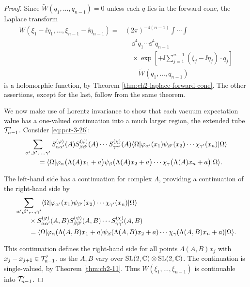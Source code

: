 \begin{proof}
Since $\widetilde{W}(q_1,\ldots,q_{n-1})=0$ unless each $q$ lies in the
forward cone, the Laplace transform
\begin{equation*}
 \begin{aligned}
 W(\xi_1-\ii\eta_1,\ldots,\xi_{n-1}-\ii\eta_{n-1})
 ={}&(2\pi)^{-4(n-1)}\int\cdots\int\\[-2pt]
 &\quad\dd^4q_1\cdots\dd^4q_{n-1}\\[-2pt]
 &\quad\times\exp\!\left[+\ii\sum_{j=1}^{n-1}
 (\xi_j-\ii\eta_j)\!\cdot q_j\right]\\[-2pt]
 &\qquad\widetilde{W}(q_1,\ldots,q_{n-1})
 \end{aligned}
\end{equation*}
is a holomorphic function, by Theorem \ref{thm:ch2-laplace-forward-cone}. The other assertions, except for
the last, follow from the same theorem.

We now make use of Lorentz invariance to show that each vacuum expectation
value has a one-valued continuation into a much larger region, the extended
tube $\mathcal{T}^{\prime}_{n-1}$. Consider \eqref{eq:pct-3-26}:
\begin{align*}
 &\sum_{\alpha',\beta',\ldots,\gamma'}
 S^{(\varphi)}_{\alpha\alpha'}(A)S^{(\psi)}_{\beta\beta'}(A)\cdots
 S^{(\chi)}_{\gamma\gamma'}(A)
 \langle \Omega\rvert\varphi_{\alpha'}(x_1)\psi_{\beta'}(x_2)\cdots
 \chi_{\gamma'}(x_n)\lvert \Omega\rangle \\
 &\qquad=\langle \Omega\rvert\varphi_\alpha\bigl(\Lambda(A)x_1+a\bigr)
 \psi_\beta\bigl(\Lambda(A)x_2+a\bigr)\cdots
 \chi_\gamma\bigl(\Lambda(A)x_n+a\bigr)\lvert \Omega\rangle.
\end{align*}

The left-hand side has a continuation for complex $\Lambda$, providing a
continuation of the right-hand side by
\begin{align*}
 &\sum_{\alpha',\beta',\ldots,\gamma'}
 \langle \Omega\rvert\varphi_{\alpha'}(x_1)\psi_{\beta'}(x_2)\cdots
 \chi_{\gamma'}(x_n)\lvert \Omega\rangle\\[-2pt]
 &\qquad\times S^{(\varphi)}_{\alpha\alpha'}(A,B)
 S^{(\psi)}_{\beta\beta'}(A,B)\cdots S^{(\chi)}_{\gamma\gamma'}(A,B)\\
 &\qquad=\langle \Omega\rvert\varphi_\alpha(\Lambda(A,B)x_1+a)
 \psi_\beta(\Lambda(A,B)x_2+a)\cdots
 \chi_\gamma(\Lambda(A,B)x_n+a)\lvert \Omega\rangle.
\end{align*}

This continuation defines the right-hand side for all points $\Lambda(A,B)x_j$
with $x_j-x_{j+1}\in\mathcal{T}^{\prime}_{n-1}$, as the $A,B$ vary over
$\mathrm{SL}(2,\mathbb{C})\otimes\mathrm{SL}(2,\mathbb{C})$. The continuation is
single-valued, by Theorem \ref{thm:ch2-11}. Thus $W(\xi_1,\ldots,\xi_{n-1})$ is
continuable into $\mathcal{T}^{\prime}_{n-1}$.
\end{proof}

